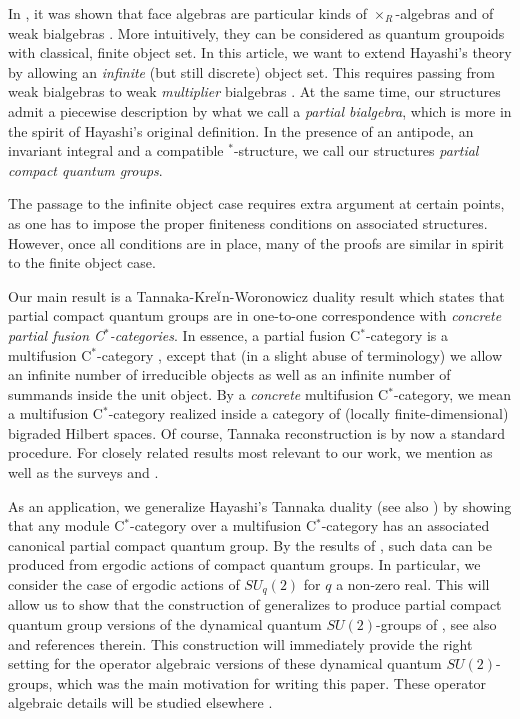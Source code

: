 \documentclass[10pt]{article}
\theoremstyle{definition}
\numberwithin{equation}{section}
\begin{document}
In \cite{Nil1,Sch1,Sch2}, it was shown that face algebras are particular kinds of $\times_R$-algebras \cite{Tak2} and of weak bialgebras \cite{Boh3}. More intuitively, they can be considered as quantum groupoids with  classical, finite object set. In this article, we want to extend Hayashi's theory by allowing an \emph{infinite} (but still discrete) object set. This requires passing from weak bialgebras to weak \emph{multiplier} bialgebras \cite{Boh1}. At the same time, our structures admit a piecewise description by what we call a \emph{partial bialgebra}, which is more in the spirit of Hayashi's original definition. In the presence of an antipode, an invariant integral and a compatible $^*$-structure, we call our structures \emph{partial compact quantum groups}. 

The passage to the infinite object case requires extra argument at certain points, as one has to impose the proper finiteness conditions on associated structures. However, once all conditions are in place, many of the proofs are similar in spirit to the finite object case. 

Our main result is a Tannaka-Kre$\breve{\textrm{\i}}$n-Woronowicz duality result which states that partial compact quantum groups are in one-to-one correspondence with \emph{concrete partial fusion C$^*$-categories}. In essence, a partial fusion C$^*$-category is a multifusion C$^*$-category \cite{ENO1}, except that (in a slight abuse of terminology) we allow an infinite number of irreducible objects as well as an infinite number of summands inside the unit object. By a \emph{concrete} multifusion C$^*$-category, we mean a multifusion C$^*$-category realized inside a category of (locally finite-dimensional) bigraded Hilbert spaces. Of course, Tannaka reconstruction is by now a standard procedure. For closely related results most relevant to our work, we mention \cite{Wor2,Sch3,Hay8,Ost1,Hai1,Szl1,Pfe1,DCY1,Nes1} as well as the surveys \cite{JoS1} and \cite[Section 2.3]{NeT1}.

As an application, we generalize Hayashi's Tannaka duality \cite{Hay8} (see also \cite{Ost1}) by showing that any module C$^*$-category over a multifusion C$^*$-category has an associated canonical partial compact quantum group. By the results of \cite{DCY1}, such data can be produced from ergodic actions of compact quantum groups. In particular,  we consider the case of ergodic actions of $SU_q(2)$ for $q$ a non-zero real. This will allow us to show that the construction of \cite{Hay4} generalizes to produce partial compact quantum group versions of the dynamical quantum $SU(2)$-groups of \cite{EtV1,KoR1}, see also \cite{Sto1} and references therein. This construction will immediately provide the right setting for the operator algebraic versions of these dynamical quantum $SU(2)$-groups, which was the main motivation for writing this paper. These operator algebraic details will be studied elsewhere \cite{DCT2}.
\end{document}
